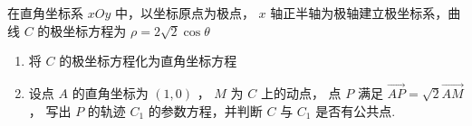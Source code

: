 \documentclass[class=ctexart,crop=false]{standalone}
\begin{document}
在直角坐标系 $xOy$ 中，以坐标原点为极点，
$x$ 轴正半轴为极轴建立极坐标系，曲线 $C$ 的极坐标方程为
$\rho=2 \sqrt{2}\cos{\theta}$
\begin{enumerate}[label=(\arabic*)]
    \item 将 $C$ 的极坐标方程化为直角坐标方程
    \item 设点 $A$ 的直角坐标为 $(1,0)$ ， $M$ 为 $C$ 上的动点，
          点 $P$ 满足 $\overrightarrow {AP}=\sqrt{2} \overrightarrow {AM}$ ，
          写出 $P$ 的轨迹 $C_1$ 的参数方程，并判断 $C$ 与 $C_1$ 是否有公共点.
\end{enumerate}
\end{document}
